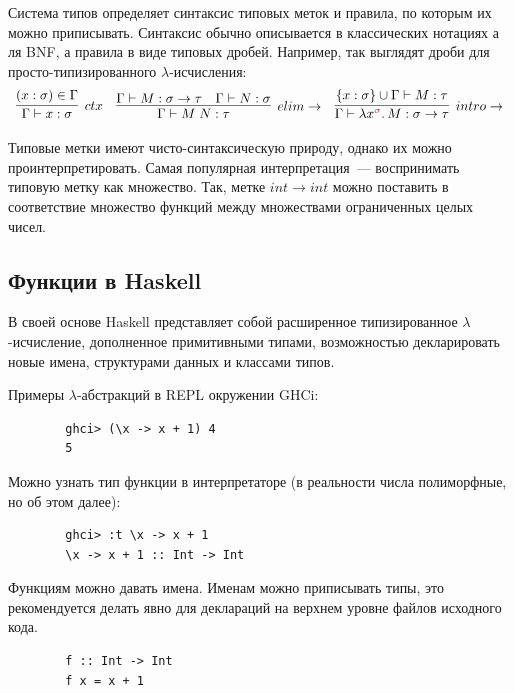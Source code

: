 \documentclass[12pt]{article}
\begin{document}
    Система типов определяет синтаксис типовых меток и правила, по которым их можно приписывать.
    Синтаксис обычно описывается в классических нотациях а ля BNF, а правила в виде типовых дробей.
    Например, так выглядят дроби для просто-типизированного $\lambda$-исчисления:
    \[
        \begin{array}{l c r}
            \infer[ctx]{\Gamma \vdash x: \sigma}{(x: \sigma) \in \Gamma}
            &
            \infer[elim\to]{\Gamma \vdash M\;N : \tau}{\Gamma \vdash M : \sigma \to \tau & \Gamma \vdash N : \sigma}
            &
            \infer[intro\to]{\Gamma \vdash \lambda x^{\color{red} \sigma}\ldotp M : \sigma \to \tau}{\{x : \sigma\} \cup \Gamma \vdash M : \tau}
        \end{array}
    \]

    Типовые метки имеют чисто-синтаксическую природу, однако их можно проинтерпретировать.
    Самая популярная интерпретация~--- воспринимать типовую метку как множество.
    Так, метке $int \to int$ можно поставить в соответствие множество функций между множествами ограниченных целых чисел.

    \subsection{Функции в Haskell}

    В своей основе Haskell представляет собой расширенное типизированное $\lambda$-исчисление, дополненное примитивными типами, возможностью декларировать новые имена, структурами данных и классами типов.

    Примеры $\lambda$-абстракций в REPL окружении GHCi:

    \begin{verbatim}
        ghci> (\x -> x + 1) 4
        5
    \end{verbatim}

    Можно узнать тип функции в интерпретаторе (в реальности числа полиморфные, но об этом далее):
    \begin{verbatim}
        ghci> :t \x -> x + 1
        \x -> x + 1 :: Int -> Int
    \end{verbatim}

    Функциям можно давать имена.
    Именам можно приписывать типы, это рекомендуется делать явно для деклараций на верхнем уровне файлов исходного кода.
    \begin{verbatim}
        f :: Int -> Int
        f x = x + 1
    \end{verbatim}
\end{document}
